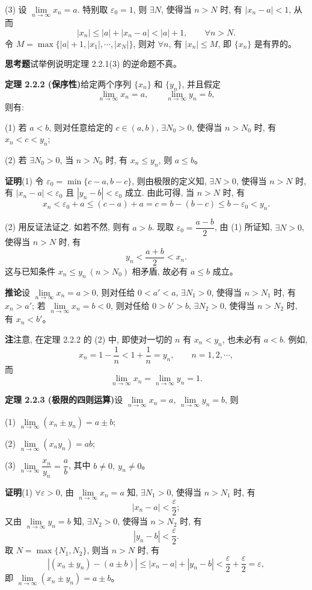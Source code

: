 \documentclass[UTF8,12pt,a4paper,fontset=fandol]{ctexart}
\begin{document}
(3) 设 $\lim\limits_{n\to\infty}x_n=a$. 特别取 $\varepsilon_0=1$, 则 $\exists N$, 使得当 $n>N$ 时, 有 $|x_n-a|<1$, 从而
\[
  |x_n|\leqslant |a|+|x_n-a|<|a|+1,\qquad \forall n>N.
\]
令 $M=\max\{|a|+1,|x_1|,\cdots,|x_N|\}$, 则对 $\forall n$, 有 $|x_n|\leqslant M$, 即 $\{x_n\}$ 是有界的。

\noindent\textbf{思考题}\quad 试举例说明定理 2.2.1(3) 的逆命题不真。

\noindent\textbf{定理 2.2.2 (保序性)}\quad 给定两个序列 $\{x_n\}$ 和 $\{y_n\}$, 并且假定
\[
  \lim_{n\to\infty}x_n=a,\qquad
  \lim_{n\to\infty}y_n=b,
\]
则有:

(1) 若 $a<b$, 则对任意给定的 $c\in(a,b)$, $\exists N_0>0$, 使得当 $n>N_0$ 时, 有 $x_n<c<y_n$;

(2) 若 $\exists N_0>0$, 当 $n>N_0$ 时, 有 $x_n\leqslant y_n$, 则 $a\leqslant b$。

\noindent\textbf{证明}\quad (1) 令 $\varepsilon_0=\min\{c-a,b-c\}$, 则由极限的定义知, $\exists N>0$, 使得当 $n>N$ 时, 有 $|x_n-a|<\varepsilon_0$ 且 $|y_n-b|<\varepsilon_0$ 成立. 由此可得, 当 $n>N$ 时, 有
\[
  x_n<\varepsilon_0+a\leqslant(c-a)+a=c=b-(b-c)\leqslant b-\varepsilon_0<y_n.
\]

(2) 用反证法证之. 如若不然, 则有 $a>b$. 现取 $\varepsilon_0=\dfrac{a-b}{2}$, 由 (1) 所证知, $\exists N>0$, 使得当 $n>N$ 时, 有
\[
  y_n<\frac{a+b}{2}<x_n.
\]
这与已知条件 $x_n\leqslant y_n\ (n>N_0)$ 相矛盾, 故必有 $a\leqslant b$ 成立。

\noindent\textbf{推论}\quad 设 $\lim\limits_{n\to\infty}x_n=a>0$, 则对任给 $0<a'<a$, $\exists N_1>0$, 使得当 $n>N_1$ 时, 有 $x_n>a'$; 若 $\lim\limits_{n\to\infty}x_n=b<0$, 则对任给 $0>b'>b$, $\exists N_2>0$, 使得当 $n>N_2$ 时, 有 $x_n<b'$。

\noindent\textbf{注}\quad 注意, 在定理 2.2.2 的 (2) 中, 即使对一切的 $n$ 有 $x_n<y_n$, 也未必有 $a<b$. 例如,
\[
  x_n=1-\frac1n<1+\frac1n=y_n,\qquad n=1,2,\cdots,
\]
而
\[
  \lim_{n\to\infty}x_n=\lim_{n\to\infty}y_n=1.
\]

\noindent\textbf{定理 2.2.3 (极限的四则运算)}\quad 设 $\lim\limits_{n\to\infty}x_n=a$, $\lim\limits_{n\to\infty}y_n=b$, 则

(1) $\lim\limits_{n\to\infty}(x_n\pm y_n)=a\pm b$;

(2) $\lim\limits_{n\to\infty}(x_ny_n)=ab$;

(3) $\lim\limits_{n\to\infty}\dfrac{x_n}{y_n}=\dfrac ab$, 其中 $b\ne0,\ y_n\ne0$。

\noindent\textbf{证明}\quad (1) $\forall\varepsilon>0$, 由 $\lim\limits_{n\to\infty}x_n=a$ 知, $\exists N_1>0$, 使得当 $n>N_1$ 时, 有
\[
  |x_n-a|<\frac\varepsilon2;
\]
又由 $\lim\limits_{n\to\infty}y_n=b$ 知, $\exists N_2>0$, 使得当 $n>N_2$ 时, 有
\[
  |y_n-b|<\frac\varepsilon2.
\]
取 $N=\max\{N_1,N_2\}$, 则当 $n>N$ 时, 有
\[
  |(x_n\pm y_n)-(a\pm b)|
  \leqslant |x_n-a|+|y_n-b|
  <\frac\varepsilon2+\frac\varepsilon2=\varepsilon,
\]
即 $\lim\limits_{n\to\infty}(x_n\pm y_n)=a\pm b$。
\end{document}
